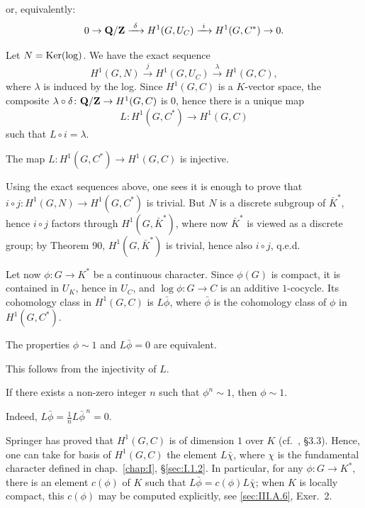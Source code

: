 
or, equivalently:
\[
0\to \mathbf{Q}/\mathbf{Z} \xrightarrow{\ \delta\ } H^1(G,U_C)
\xrightarrow{\ i\ } H^1(G,C^*) \to 0.
\]

Let $N=\mathrm{Ker}(\log)$.  We have the exact sequence
\[
H^1(G,N) \xrightarrow{\ j\ } H^1(G,U_C)
\xrightarrow{\ \lambda\ } H^1(G,C),
\]
where $\lambda$ is induced by the log.  Since $H^1(G,C)$ is a
$K$-vector space, the composite $\lambda\circ\delta\colon \mathbf{Q}/\mathbf{Z} \to
H^1(G,C)$ is $0$, hence there is a unique map
\[
L\colon H^1(G,C^*) \to H^1(G,C)
\]
such that $L\circ i=\lambda$.

\begin{proposition}[2]\label{prop:III.A.2.2}
The map $L\colon H^1(G,C^*)\to H^1(G,C)$ is injective.
\end{proposition}

Using the exact sequences above, one sees it is enough to prove that
$i\circ j\colon H^1(G,N)\to H^1(G,C^*)$ is trivial.  But $N$ is a
discrete subgroup of $\bar K^*$, hence $i\circ j$ factors through
$H^1(G,\bar K^*)$, where now $\bar K^*$ is viewed as a discrete group;
by Theorem 90, $H^1(G,\bar K^*)$ is trivial, hence also $i\circ j$,
q.e.d.

Let now $\phi\colon G\to K^*$ be a continuous character.  Since
$\phi(G)$ is compact, it is contained in $U_K$, hence in $U_C$, and
$\log\phi\colon G\to C$ is an additive $1$-cocycle.  Its cohomology
class in $H^1(G,C)$ is $L\bar\phi$, where $\bar\phi$ is the cohomology
class of $\phi$ in $H^1(G,C^*)$.

\begin{proposition}[3]\label{prop:III.A.2.3}
The properties $\phi\sim 1$ and $L\bar\phi=0$ are equivalent.
\end{proposition}

This follows from the injectivity of $L$.

\begin{corollary}
If there exists a non-zero integer $n$ such that $\phi^n\sim 1$, then
$\phi\sim 1$.
\end{corollary}

Indeed, $L\bar\phi = \frac{1}{n}L\bar\phi^{\,n} = 0$.


Springer has proved that $H^1(G,C)$ is of dimension $1$ over $K$
(cf.~\cite{tate-pdiv}, \S3.3).  Hence, one can take for basis of
$H^1(G,C)$ the element $L\bar\chi$, where $\chi$ is the fundamental
character defined in chap.~\ref{chap:I}, \S\ref{sec:I.1.2}.  In
particular, for any $\phi\colon G\to K^*$, there is an element
$c(\phi)$ of $K$ such that $L\bar\phi=c(\phi)L\bar\chi$; when $K$ is
locally compact, this $c(\phi)$ may be computed explicitly, see
\ref{sec:III.A.6}, Exer.~2.

